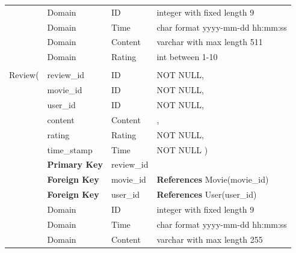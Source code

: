 \documentclass[12pt]{article}
\begin{document}
\begin{table}[H]
\renewcommand\arraystretch{1.1}
\centering
	\begin{tabular}{l l l l}
		\hline
		&Domain & ID & integer with fixed length 9\\
		&Domain & Time  & char format yyyy-mm-dd hh:mm:ss\\
        &Domain & Content & varchar with max length 511\\
        &Domain & Rating & int between 1-10\\
        
        \\Review(
        & review\_id & ID & NOT NULL,\\
        & movie\_id & ID & NOT NULL,\\
        & user\_id & ID & NOT NULL,\\
        & content & Content &,\\
        & rating & Rating & NOT NULL,\\
        & time\_stamp & Time & NOT NULL
        \hspace{4PT} )\\
        &\textbf{Primary Key}& review\_id&\\
        &\textbf{Foreign Key}& movie\_id &\textbf{References} Movie(movie\_id)\\
        &\textbf{Foreign Key}& user\_id&\textbf{References} User(user\_id)\\
		\hline
		&Domain & ID & integer with fixed length 9\\
		&Domain & Time  & char format yyyy-mm-dd hh:mm:ss\\
        &Domain & Content & varchar with max length 255\\
        

\end{tabular}
\end{table}
\end{document}
